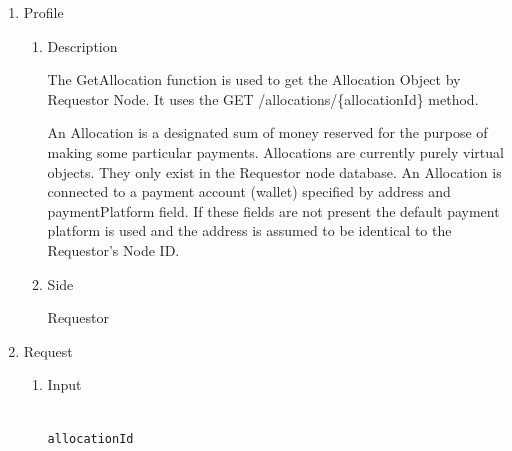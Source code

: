 \newpage



\begin{enumerate}

\item Profile

\begin{enumerate}

\item Description

The GetAllocation function is used to get the Allocation Object by Requestor Node. 
It uses the GET /allocations/\{allocationId\} method.

An Allocation is a designated sum of money reserved for the purpose of making some particular payments. 
Allocations are currently purely virtual objects. They only exist in the Requestor node database.
An Allocation is connected to a payment account (wallet) specified by address and paymentPlatform field. 
If these fields are not present the default payment platform is used and the address is assumed 
to be identical to the Requestor's Node ID.

 
\item Side

Requestor

\end{enumerate}

\item Request

\begin{enumerate}

\item Input

\begin{tcolorbox}[boxrule=0pt, frame empty]
\begin{verbatim}

allocationId

\end{verbatim}
\end{tcolorbox}



\end{enumerate}
\end{enumerate}
